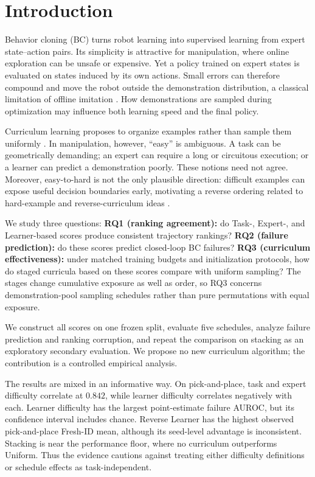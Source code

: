\section{Introduction}
\label{sec:introduction}

Behavior cloning (BC) turns robot learning into supervised learning from
expert state--action pairs. Its simplicity is attractive for manipulation,
where online exploration can be unsafe or expensive. Yet a policy trained on
expert states is evaluated on states induced by its own actions. Small errors
can therefore compound and move the robot outside the demonstration
distribution, a classical limitation of offline imitation
\citep{pomerleau1989alvinn,ross2011dagger}. How demonstrations are sampled
during optimization may influence both learning speed and the final policy.

Curriculum learning proposes to organize examples rather than sample them
uniformly \citep{bengio2009curriculum}. In manipulation, however, ``easy'' is
ambiguous. A task can be geometrically demanding; an expert can require a long
or circuitous execution; or a learner can predict a demonstration poorly.
These notions need not agree. Moreover, easy-to-hard is not the only plausible
direction: difficult examples can expose useful decision boundaries early,
motivating a reverse ordering related to hard-example and reverse-curriculum
ideas \citep{florensa2017reverse}.

We study three questions: \textbf{RQ1 (ranking agreement):} do Task-, Expert-,
and Learner-based scores produce consistent trajectory rankings?
\textbf{RQ2 (failure prediction):} do these scores predict closed-loop BC
failures? \textbf{RQ3 (curriculum effectiveness):} under matched training
budgets and initialization protocols, how do staged curricula based on these
scores compare with uniform sampling? The stages change cumulative exposure as
well as order, so RQ3 concerns demonstration-pool sampling schedules rather
than pure permutations with equal exposure.

We construct all scores on one frozen split, evaluate five schedules, analyze
failure prediction and ranking corruption, and repeat the comparison on
stacking as an exploratory secondary evaluation. We propose no new curriculum
algorithm; the contribution is a controlled empirical analysis.

The results are mixed in an informative way. On pick-and-place, task and
expert difficulty correlate at $0.842$, while learner difficulty correlates
negatively with each. Learner difficulty has the largest point-estimate
failure AUROC, but its confidence interval includes chance. Reverse Learner
has the highest observed pick-and-place Fresh-ID mean, although its seed-level
advantage is inconsistent. Stacking is near the performance floor, where no
curriculum outperforms Uniform. Thus the evidence cautions against treating
either difficulty definitions or schedule effects as task-independent.
